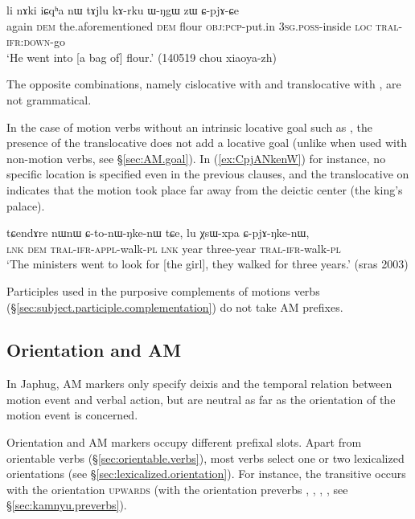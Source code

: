 \begin{exe}
\ex \label{ex:CpjACe}
 \gll li nɤki iɕqʰa nɯ tɤjlu kɤ-rku ɯ-ŋgɯ zɯ ɕ-pjɤ-ɕe \\
 again \textsc{dem} the.aforementioned \textsc{dem} flour \textsc{obj}:\textsc{pcp}-put.in \textsc{3sg}.\textsc{poss}-inside \textsc{loc} \textsc{tral}-\textsc{ifr}:\textsc{down}-go \\
 \glt `He went into [a bag of] flour.' (140519 chou xiaoya-zh) 
\end{exe}

The opposite combinations, namely cislocative with  and translocative with , are not grammatical. 

In the case of motion verbs without an intrinsic locative goal such as , the presence of the translocative does not add a locative goal (unlike when used with non-motion verbs, see §\ref{sec:AM.goal}). In (\ref{ex:CpjANkenW}) for instance, no specific location is specified even in the previous clauses, and the translocative on   indicates that the motion took place far away from the deictic center (the king's palace).

\begin{exe}
\ex \label{ex:CpjANkenW}
 \gll tɕendɤre nɯnɯ ɕ-to-nɯ-ŋke-nɯ tɕe, lu χsɯ-xpa ɕ-pjɤ-ŋke-nɯ, \\
 \textsc{lnk} \textsc{dem} \textsc{tral}-\textsc{ifr}-\textsc{appl}-walk-\textsc{pl} \textsc{lnk} year three-year \textsc{tral}-\textsc{ifr}-walk-\textsc{pl} \\
\glt `The ministers went to look for [the girl], they walked for three years.' (sras 2003)
\end{exe}

Participles used in the purposive complements of motions verbs (§\ref{sec:subject.participle.complementation}) do not take AM prefixes.

\subsection{Orientation and AM} \label{sec:orientation.AM}
In Japhug, AM markers only specify deixis and the temporal relation between motion event and verbal action, but are neutral as far as the orientation of the motion event is concerned.

Orientation and AM markers occupy different prefixal slots. Apart from orientable verbs (§\ref{sec:orientable.verbs}), most verbs select one or two lexicalized orientations (see §\ref{sec:lexicalized.orientation}). For instance, the transitive  occurs with the orientation \textsc{upwards} (with the orientation preverbs , , , , see §\ref{sec:kamnyu.preverbs}). 

